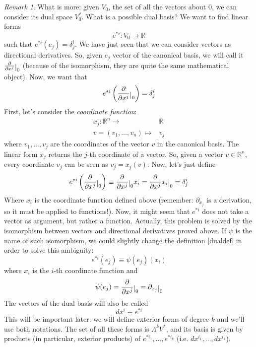 \documentclass[a4paper,11pt,titlepage]{article}
\numberwithin{equation}{section}
\theoremstyle{definition}
\theoremstyle{remark}
\newtheorem{remark}[theorem]{Remark}
\newcommand{\rfield}{\mathbb{R}}
\newcommand{\restrict}[2]{{#1}\raisebox{-.5ex}{$|$}_{#2}}
\begin{document}
\begin{remark}
What is more: given $V_0$, the set of all the vectors about $0$, we can consider its dual space $V_0^*$. %
What is a possible dual basis?  We want to find linear forms $$e^{*i} \colon V_0 \rightarrow \rfield$$ such that $e^{*i}(e_j) = \delta_j^i$.
We have just seen that we can consider vectors as directional derivatives. So, given $e_j$ vector of the canonical basis, we will call it $\restrict{\frac{\partial}{\partial x^j}}{0}$ (because of the isomorphism, they are quite the same mathematical object).
Now, we want that
\begin{equation} \label{dualbasisdelta}
e^{*i}\left( \restrict{\frac{\partial}{\partial x^j}}{0} \right) = \delta_j^i
\end{equation}
First, let's consider the \textit{coordinate function}:
\begin{align} \label{coofunc}
x_j \colon \rfield^n \rightarrow & \rfield \\
v=(v_1, \ldots, v_n) \mapsto &v_j \nonumber
\end{align}
where $v_1, \ldots, v_j$ are the coordinates of the vector $v$ in the canonical basis. The linear form $x_j$ returns the $j$-th coordinate of a vector. So, given a vector $v \in \rfield^n$, every coordinate $v_j$ can be seen as $v_j = x_j(v)$.
Now, let's just define
\begin{equation} \label{dualdef}
e^{*i}\left( \restrict{\frac{\partial}{\partial x^j}}{0} \right) \equiv \restrict{\frac{\partial}{\partial x^j}}{0} x_i =\restrict{\frac{\partial}{\partial x^j} x_i}{0} = \delta_j^i
\end{equation}
Where $x_i$ is the coordinate function defined above (remember: $\partial_{x_j}$ is a derivation, so it must be applied to functions!). Now, it might seem that $e^{*i}$ does not take a vector as argument, but rather a function. Actually, this problem is solved by the isomorphism between vectors and directional derivatives proved above. If $\psi$ is the name of such isomorphism, we could slightly change the definition \eqref{dualdef} in order to solve this ambiguity:
\begin{equation}
e^{*i}(e_j) \equiv \psi(e_j) (x_i)
\end{equation}
where $x_i$ is the $i$-th coordinate function and
\begin{equation}
\psi(e_j) = \restrict{\frac{\partial}{\partial x^j}}{0} = \restrict{\partial_{x_j}}{0}
\end{equation}
The vectors of the dual basis will also be called
\begin{equation}
  dx^i \equiv e^{*i}
\end{equation}
This will be important later: we will define exterior forms of degree $k$ and we'll use both notations. The set of all these forms is $\Lambda^k V^*$, and its basis is given by products (in particular, exterior products) of $e^{*i_1}, \ldots, e^{*i_k}$ (i.e. $dx^{i_1}, \ldots, dx^{i_k}$).
\end{remark}
\end{document}

